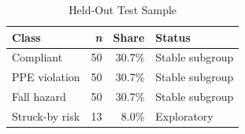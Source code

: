 \begin{table}[t]
\centering
\caption{Held-Out Test Sample}
\label{tab:dataset}
\begin{tabular}{@{}lrrl@{}}
\toprule
Class & \textit{n} & Share & Status \\
\midrule
Compliant & 50 & 30.7\% & Stable subgroup \\
PPE violation & 50 & 30.7\% & Stable subgroup \\
Fall hazard & 50 & 30.7\% & Stable subgroup \\
Struck-by risk & 13 & 8.0\% & Exploratory \\
\bottomrule
\end{tabular}
\end{table}

